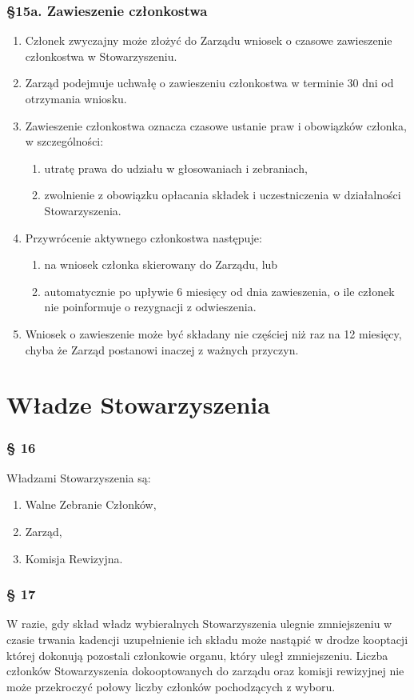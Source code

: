 \documentclass{article}
\newcommand{\myparagraph}[1]{\subsubsection*{#1}}
\begin{document}
\myparagraph{\S 15a. Zawieszenie członkostwa}
\begin{enumerate}
    \item Członek zwyczajny może złożyć do Zarządu wniosek o czasowe zawieszenie członkostwa w Stowarzyszeniu.
    
    \item Zarząd podejmuje uchwałę o zawieszeniu członkostwa w terminie 30 dni od otrzymania wniosku.
    
    \item Zawieszenie członkostwa oznacza czasowe ustanie praw i obowiązków członka, w szczególności:
    \begin{enumerate}
        \item utratę prawa do udziału w głosowaniach i zebraniach,
        \item zwolnienie z obowiązku opłacania składek i uczestniczenia w działalności Stowarzyszenia.
    \end{enumerate}
    
    \item Przywrócenie aktywnego członkostwa następuje:
    \begin{enumerate}
        \item na wniosek członka skierowany do Zarządu, lub
        \item automatycznie po upływie 6 miesięcy od dnia zawieszenia, o ile członek nie poinformuje o rezygnacji z odwieszenia.
    \end{enumerate}
    
    \item Wniosek o zawieszenie może być składany nie częściej niż raz na 12 miesięcy, chyba że Zarząd postanowi inaczej z ważnych przyczyn.
\end{enumerate}


\section{Władze Stowarzyszenia}
\myparagraph{§ 16}
Władzami Stowarzyszenia są:
\begin{enumerate}
\item
  Walne Zebranie Członków,
\item
  Zarząd,
\item
  Komisja Rewizyjna.
\end{enumerate}

\myparagraph{§ 17}
W razie, gdy skład władz wybieralnych Stowarzyszenia ulegnie zmniejszeniu w czasie trwania kadencji uzupełnienie ich składu może nastąpić w drodze kooptacji której dokonują pozostali członkowie organu, który uległ zmniejszeniu. Liczba członków Stowarzyszenia dokooptowanych do zarządu oraz komisji rewizyjnej nie może przekroczyć połowy liczby członków pochodzących z wyboru.
\end{document}
